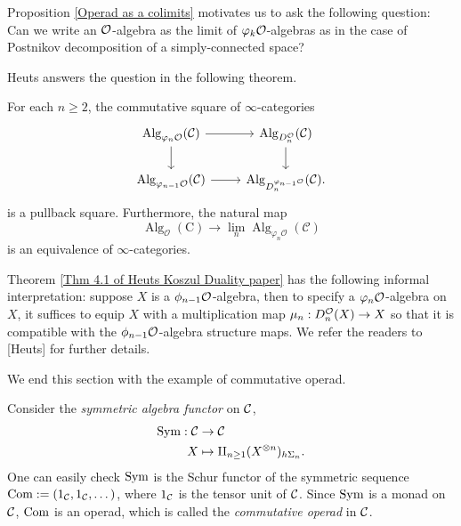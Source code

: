 Proposition \ref{Operad as a colimits} motivates us to ask the following question: Can we write an ${\mathcal{O}}$-algebra as the limit of $\varphi_k{\mathcal{O}}$-algebras as in the case of Postnikov decomposition of a simply-connected space? 

Heuts answers the question in the following theorem.
\begin{theorem}
\cite[Theorem 4.1]{Heuts_Koszul}
\label{Thm 4.1 of Heuts Koszul Duality paper}
For each $n \geq 2$, the commutative square of $\infty$-categories
\[
\begin{tikzcd}
	\Alg_{\varphi_n\CO}(\CC) & 
	\Alg_{D^{\CO}_{n}}(\CC)\\
	\Alg_{\varphi_{n-1}\CO} (\CC)  & 
	\Alg_{D_{n}^{\varphi_{n-1}\CO}}(\CC)
	\arrow[from=1-1, to= 1-2]
	\arrow[from=1-1, to=2-1]
	\arrow[from=1-2, to=2-2]
	\arrow[from=2-1, to= 2-2].
\end{tikzcd}
\]
is a pullback square. Furthermore, the natural map
$$
\operatorname{Alg}_{\mathcal{O}}(\mathrm{C}) \rightarrow \lim _{n} \operatorname{Alg}_{\varphi_{n} \mathcal{O}}(\mathcal{C})
$$
is an equivalence of $\infty$-categories.
\end{theorem}

\begin{remark}
Theorem \ref{Thm 4.1 of Heuts Koszul Duality paper} has the following informal interpretation: suppose $X$ is a $\phi_{n-1}{\mathcal{O}}$-algebra, then to specify a $\varphi_n{\mathcal{O}}$-algebra on $X$, it suffices to equip $X$ with a multiplication map $\mu_n: D^{{\mathcal{O}}}_n(X)\to X$ so that it is compatible with the $\phi_{n-1}{\mathcal{O}}$-algebra structure maps. We refer the readers to [Heuts] for further details.
\end{remark}

We end this section with the example of commutative operad.
\begin{example}
	Consider the \emph{symmetric algebra functor} on ${\mathcal{C}}$,
	\begin{align*}
		\operatorname{Sym}:{\mathcal{C}} & \to  {\mathcal{C}}\\
		X & \mapsto \amalg_{n\geq 1} (X^{\otimes n})_{h\Sigma_n}.
	\end{align*}
	One can easily check $\operatorname{Sym}$ is the Schur functor of the symmetric sequence $\operatorname{Com}:=(1_{\mathcal{C}},1_{\mathcal{C}},\dots)$, where $1_{\mathcal{C}}$ is the tensor unit of ${\mathcal{C}}$.
	Since $\operatorname{Sym}$ is a monad on ${\mathcal{C}}$, $\operatorname{Com}$ is an operad, which is called the \emph{commutative operad} in ${\mathcal{C}}$.
\end{example}



